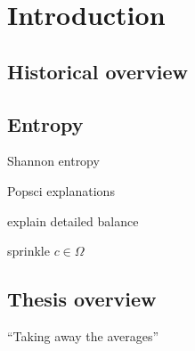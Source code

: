 \chapter{Introduction}

\section{Historical overview}




\section{Entropy}

Shannon entropy

Popsci explanations

explain detailed balance

sprinkle \(c\in\Omega\)


\section{Thesis overview}

``Taking away the averages''

